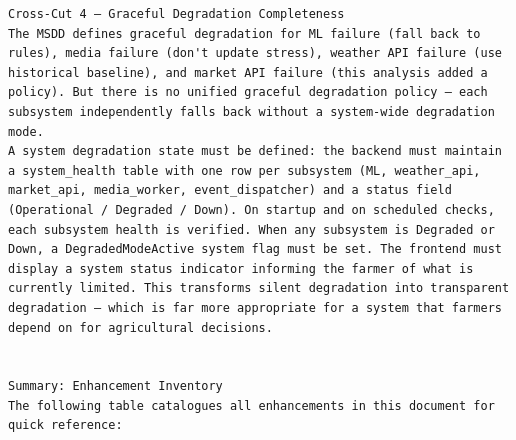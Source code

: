 \documentclass{article}
\begin{document}
\begin{verbatim}
Cross-Cut 4 — Graceful Degradation Completeness
The MSDD defines graceful degradation for ML failure (fall back to rules), media failure (don't update stress), weather API failure (use historical baseline), and market API failure (this analysis added a policy). But there is no unified graceful degradation policy — each subsystem independently falls back without a system-wide degradation mode.
A system degradation state must be defined: the backend must maintain a system_health table with one row per subsystem (ML, weather_api, market_api, media_worker, event_dispatcher) and a status field (Operational / Degraded / Down). On startup and on scheduled checks, each subsystem health is verified. When any subsystem is Degraded or Down, a DegradedModeActive system flag must be set. The frontend must display a system status indicator informing the farmer of what is currently limited. This transforms silent degradation into transparent degradation — which is far more appropriate for a system that farmers depend on for agricultural decisions.


Summary: Enhancement Inventory
The following table catalogues all enhancements in this document for quick reference:


\end{verbatim}
\end{document}
